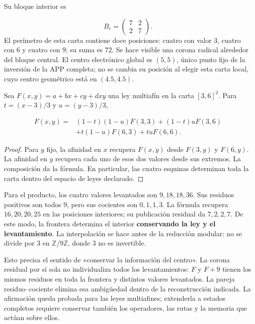 

Su bloque interior es

\[
B_c=\begin{pmatrix}7&2\\2&7\end{pmatrix}.
\]
El perímetro de esta carta contiene doce posiciones: cuatro con valor \(3\), cuatro con \(6\) y cuatro con \(9\); su suma es \(72\). Se hace visible una corona radical alrededor del bloque central. El centro electrónico global es \((5,5)\), único punto fijo de la inversión de la APP completa; no se cambia su posición al elegir esta carta local, cuyo centro geométrico está en \((4.5,4.5)\).

\begin{proposition}
\label{viii:prop:centro-frontera-recuperacion}
Sea \(F(x,y)=a+bx+cy+dxy\) una ley multiafín en la carta \([3,6]^2\). Para \(t=(x-3)/3\) y \(u=(y-3)/3\),

\[
\begin{aligned}
F(x,y)={}&(1-t)(1-u)F(3,3)+(1-t)uF(3,6)\\
&+t(1-u)F(6,3)+tuF(6,6).
\end{aligned}
\]
\end{proposition}
\begin{proof}
Para \(y\) fijo, la afinidad en \(x\) recupera \(F(x,y)\) desde \(F(3,y)\) y \(F(6,y)\). La afinidad en \(y\) recupera cada uno de esos dos valores desde sus extremos. La composición da la fórmula. En particular, las cuatro esquinas determinan toda la carta dentro del espacio de leyes declarado.
\end{proof}

Para el producto, los cuatro valores levantados son \(9,18,18,36\). Sus residuos positivos son todos \(9\), pero sus cocientes son \(0,1,1,3\). La fórmula recupera \(16,20,20,25\) en las posiciones interiores; su publicación residual da \(7,2,2,7\). De este modo, la frontera determina el interior \textbf{conservando la ley y el levantamiento}. La interpolación se hace antes de la reducción modular: no se divide por \(3\) en \(\mathbb Z/9\mathbb Z\), donde \(3\) no es invertible.

Esto precisa el sentido de «conservar la información del centro». La corona residual por sí sola no individualiza todos los levantamientos: \(F\) y \(F+9\) tienen los mismos residuos en toda la frontera y distintos valores levantados. La pareja residuo–cociente elimina esa ambigüedad dentro de la reconstrucción indicada. La afirmación queda probada para las leyes multiafines; extenderla a estados completos requiere conservar también los operadores, las rutas y la memoria que actúan sobre ellos.

